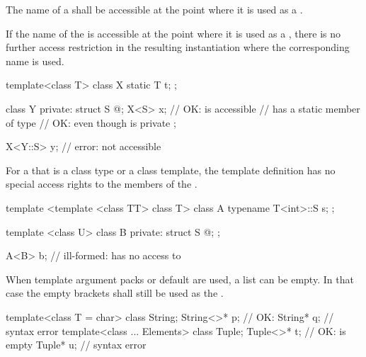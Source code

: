 \pnum
The name of a
shall be accessible at the point where it is used as a
.
\begin{note}
If the name of the
is accessible at the point where it is used as a
,
there is no further access restriction in the resulting instantiation where the
corresponding
name is used.
\end{note}
\begin{example}

\begin{codeblock}
template<class T> class X {
  static T t;
};

class Y {
private:
  struct S { @\commentellip@ };
  X<S> x;           // OK:  is accessible
                    //  has a static member of type 
                    // OK: even though  is private
};

X<Y::S> y;          // error:  not accessible
\end{codeblock}
\end{example}
For a
that is a class type or a class template, the template
definition has no special access rights to the
members of the . \begin{example}

\begin{codeblock}
template <template <class TT> class T> class A {
  typename T<int>::S s;
};

template <class U> class B {
private:
  struct S { @\commentellip@ };
};

A<B> b;             // ill-formed:  has no access to 
\end{codeblock}
\end{example}

\pnum
When template argument packs or default
are used, a
list can be empty.
In that case the empty
\tcode{<>}
brackets shall still be used as the
.
\begin{example}

\begin{codeblock}
template<class T = char> class String;
String<>* p;                    // OK: 
String* q;                      // syntax error
template<class ... Elements> class Tuple;
Tuple<>* t;                     // OK:  is empty
Tuple* u;                       // syntax error
\end{codeblock}
\end{example}

